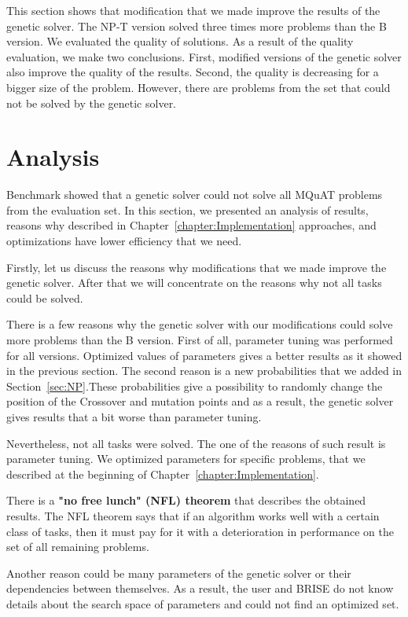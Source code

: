 This section shows that modification that we made improve the results of the genetic solver. The NP-T version solved three times more problems than the B version. We evaluated the quality of solutions. As a result of the quality evaluation, we make two conclusions. First, modified versions of the genetic solver also improve the quality of the results. Second, the quality is decreasing for a bigger size of the problem.
However, there are problems from the set that could not be solved by the genetic solver.


\section{Analysis}

Benchmark showed that a genetic solver could not solve all MQuAT problems from the evaluation set.
In this section, we presented an analysis of results, reasons why described in Chapter~\ref{chapter:Implementation} approaches, and optimizations have lower efficiency that we need.

Firstly, let us discuss the reasons why modifications that we made improve the genetic solver. After that we will concentrate on the reasons why not all tasks could be solved.

There is a few reasons why the genetic solver with our modifications could solve more problems than the B version. First of all, parameter tuning was performed for all versions. Optimized values of parameters gives a better results as it showed in the previous section. The second reason is a new probabilities that we added in Section~\ref{sec:NP}.These probabilities give a possibility to randomly change the position of the Crossover and mutation points and as a result, the genetic solver gives results that a bit worse than parameter tuning. 

Nevertheless, not all tasks were solved. The one of the reasons of such result is parameter tuning. We optimized parameters for specific problems, that we described at the beginning of Chapter~\ref{chapter:Implementation}.

There is a \textbf{"no free lunch" (NFL) theorem}\cite{wolpert1996, wolpert1997} that describes the obtained results. The NFL theorem says that if an algorithm works well with a certain class of tasks, then it must pay for it with a deterioration in performance on the set of all remaining problems.

Another reason could be many parameters of the genetic solver or their dependencies between themselves. As a result, the user and BRISE do not know details about the search space of parameters and could not find an optimized set. 

